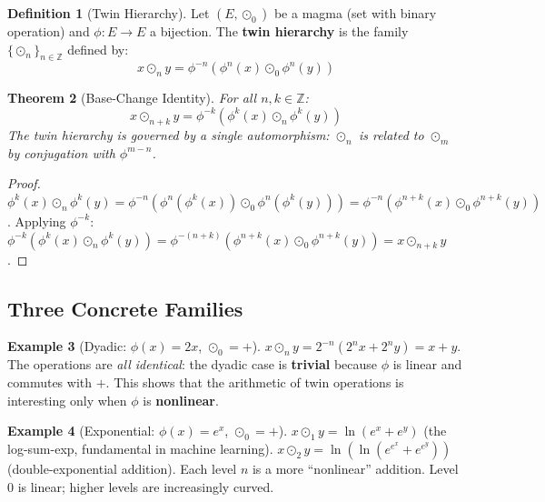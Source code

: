 \documentclass[11pt,twocolumn]{article}
\theoremstyle{plain}
\newtheorem{theorem}{Theorem}
\theoremstyle{definition}
\newtheorem{definition}[theorem]{Definition}
\newtheorem{example}[theorem]{Example}
\theoremstyle{remark}
\newcommand{\Z}{\mathbb{Z}}
\begin{document}
\begin{definition}[Twin Hierarchy]\label{def:hierarchy}
Let $(E, \odot_0)$ be a magma (set with binary operation) and $\phi: E \to E$ a bijection. The \textbf{twin hierarchy} is the family $\{\odot_n\}_{n \in \Z}$ defined by:
\begin{equation}\label{eq:twin-op}
\boxed{x \odot_n y = \phi^{-n}(\phi^n(x) \odot_0 \phi^n(y))}
\end{equation}
\end{definition}

\begin{theorem}[Base-Change Identity]\label{thm:base-change}
For all $n, k \in \Z$:
\begin{equation}\label{eq:base-change}
x \odot_{n+k} y = \phi^{-k}(\phi^k(x) \odot_n \phi^k(y))
\end{equation}
The twin hierarchy is governed by a single automorphism: $\odot_n$ is related to $\odot_m$ by conjugation with $\phi^{m-n}$.
\end{theorem}

\begin{proof}
$\phi^k(x) \odot_n \phi^k(y) = \phi^{-n}(\phi^n(\phi^k(x)) \odot_0 \phi^n(\phi^k(y))) = \phi^{-n}(\phi^{n+k}(x) \odot_0 \phi^{n+k}(y))$. Applying $\phi^{-k}$: $\phi^{-k}(\phi^k(x) \odot_n \phi^k(y)) = \phi^{-(n+k)}(\phi^{n+k}(x) \odot_0 \phi^{n+k}(y)) = x \odot_{n+k} y$.
\end{proof}


\subsection{Three Concrete Families}

\begin{example}[Dyadic: $\phi(x) = 2x$, $\odot_0 = +$]\label{ex:dyadic}
$x \odot_n y = 2^{-n}(2^n x + 2^n y) = x + y$. The operations are \emph{all identical}: the dyadic case is \textbf{trivial} because $\phi$ is linear and commutes with $+$. This shows that the arithmetic of twin operations is interesting only when $\phi$ is \textbf{nonlinear}.
\end{example}

\begin{example}[Exponential: $\phi(x) = e^x$, $\odot_0 = +$]\label{ex:exponential}
$x \odot_1 y = \ln(e^x + e^y)$ (the log-sum-exp, fundamental in machine learning).
$x \odot_2 y = \ln(\ln(e^{e^x} + e^{e^y}))$ (double-exponential addition).
Each level $n$ is a more ``nonlinear'' addition. Level 0 is linear; higher levels are increasingly curved.
\end{example}
\end{document}
